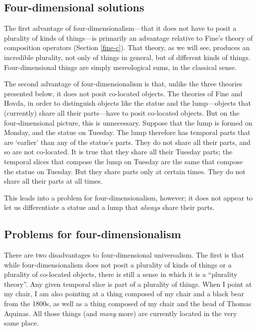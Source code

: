 \documentclass[11pt]{article}
\begin{document}
\begin{spacing}{1.5}
\subsection{Four-dimensional solutions}
\label{4ds}
The first advantage of four-dimensionalism---that it does not have to
posit a plurality of kinds of things---is primarily an advantage
relative to Fine's theory of composition operators (Section
\ref{fine-c}).  That theory, as we will see, produces an incredible
plurality, not only of things in general, but of different kinds of
things.  Four-dimensional things are simply mereological sums, in the
classical sense.

The second advantage of four-dimensionalism is that, unlike the three
theories presented below, it does not posit co-located objects.  The
theories of Fine and Hovda, in order to distinguish objects like the
statue and the lump---objects that (currently) share all their
parts---have to posit co-located objects.  But on the four-dimensional
picture, this is unnecessary.  Suppose that the lump is formed on
Monday, and the statue on Tuesday.  The lump therefore has temporal
parts that are `earlier' than any of the statue's parts.  They do not
share all their parts, and so are not co-located.  It is true that
they share all their Tuesday parts; the temporal slices that compose
the lump on Tuesday are the same that compose the statue on Tuesday.
But they share parts only at certain times.  They do not share all
their parts at all times.

This leads into a problem for four-dimensionalism, however; it does
not appear to let us differentiate a statue and a lump that {\em
  always} share their parts.

\subsection{Problems for four-dimensionalism}
\label{4dp}
There are two disadvantages to four-dimensional universalism.  The
first is that while four-dimensionalism does not posit a plurality of
kinds of things or a plurality of co-located objects, there is still a
sense in which it is a ``plurality theory''.  Any given temporal slice
is part of a plurality of things.  When I point at my chair, I am also
pointing at a thing composed of my chair and a black bear from the
1800s, as well as a thing composed of my chair and the head of Thomas
Aquinas.  All those things (and {\em many} more) are currently located
in the very same place.


\end{spacing}
\end{document}
